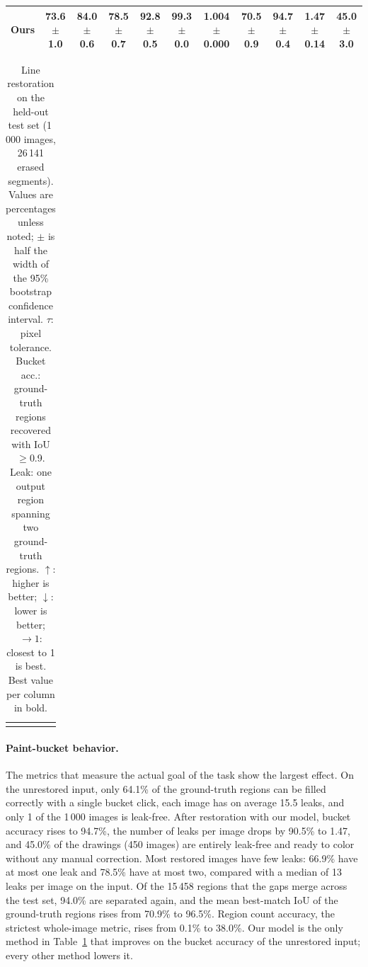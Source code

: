 \documentclass[pdflatex,sn-mathphys-num]{sn-jnl}%
\begin{document}
{\begin{tabular}{lcccccccccc}
Ours & \textbf{73.6}{\scriptsize$\pm$1.0} & \textbf{84.0}{\scriptsize$\pm$0.6} & \textbf{78.5}{\scriptsize$\pm$0.7} & \textbf{92.8}{\scriptsize$\pm$0.5} & \textbf{99.3}{\scriptsize$\pm$0.0} & \textbf{1.004}{\scriptsize$\pm$0.000} & \textbf{70.5}{\scriptsize$\pm$0.9} & \textbf{94.7}{\scriptsize$\pm$0.4} & \textbf{1.47}{\scriptsize$\pm$0.14} & \textbf{45.0}{\scriptsize$\pm$3.0} \\
\bottomrule
\end{tabular}}

\begin{table}
\caption{Line restoration on the held-out test set (1\,000 images, 26\,141 erased
segments). Values are percentages unless noted; $\pm$ is half the width of the 95\%
bootstrap confidence interval. $\tau$: pixel tolerance. Bucket acc.: ground-truth
regions recovered with IoU$\geq$0.9. Leak: one output region spanning two
ground-truth regions. $\uparrow$: higher is better; $\downarrow$: lower is better;
$\to 1$: closest to 1 is best. Best value per column in bold.}
\label{tab:main_results}
\begin{tabular}{@{}c@{}}\resizebox{\textheight}{!}{\usebox{\mainresultsbox}}\end{tabular}
\end{table}

\paragraph{Paint-bucket behavior.} The metrics that measure the actual goal of the
task show the largest effect. On the unrestored input, only 64.1\% of the
ground-truth regions can be filled correctly with a single bucket click, each image
has on average 15.5 leaks, and only 1 of the 1\,000 images is leak-free. After
restoration with our model, bucket accuracy rises to 94.7\%, the number of leaks per
image drops by 90.5\% to 1.47, and 45.0\% of the drawings (450 images) are entirely
leak-free and ready to color without any manual correction. Most restored images have few leaks: 66.9\% have at most one leak and
78.5\% have at most two, compared with a median of 13 leaks per image on the input.
Of the 15\,458 regions that the gaps merge across the test set, 94.0\% are separated
again, and the mean best-match IoU of the ground-truth regions rises from 70.9\% to
96.5\%. Region count accuracy, the strictest whole-image metric, rises from 0.1\% to
38.0\%. Our model is the only method in Table~\ref{tab:main_results} that improves
on the bucket accuracy of the unrestored input; every other method lowers it.
\end{document}
